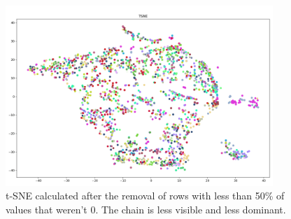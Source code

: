 \begin{figure}[h]
  \centering
  \includegraphics[width=0.9\textwidth]{./images/tsneAfterChainRemoved(50Percent).png}
  \caption{t-SNE calculated after the removal of rows with less than 50\% of values that weren't 0. The chain is less visible and less dominant.}
  \label{figure:tsneAfterChainRemoved(50Percent)}
\end{figure}
